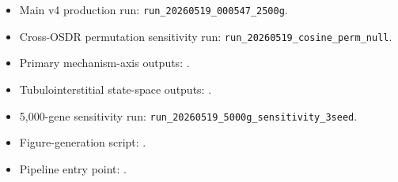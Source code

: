 \documentclass[11pt]{article}
\newcommand{\code}[1]{\texttt{#1}}
\begin{document}
\begin{itemize}
  \item Main v4 production run: \code{run\_20260519\_000547\_2500g}.
  \item Cross-OSDR permutation sensitivity run: \code{run\_20260519\_cosine\_perm\_null}.
  \item Primary mechanism-axis outputs: .
  \item Tubulointerstitial state-space outputs: .
  \item 5,000-gene sensitivity run: \code{run\_20260519\_5000g\_sensitivity\_3seed}.
  \item Figure-generation script: .
  \item Pipeline entry point: .
\end{itemize}
\end{document}

